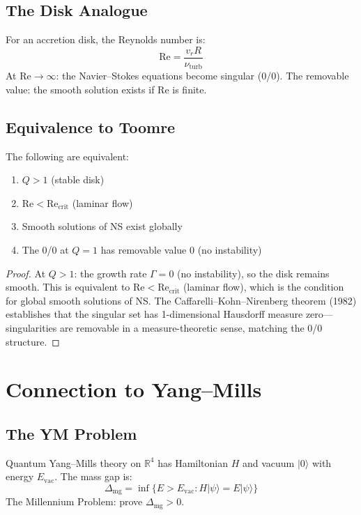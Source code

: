 \documentclass[11pt]{article}
\newcommand{\R}{\mathbb{R}}
\newcommand{\massgap}{\Delta_{\text{mg}}}
\begin{document}
\subsection{The Disk Analogue}

For an accretion disk, the Reynolds number is:
\[
  \text{Re} = \frac{v_r R}{\nu_{\text{turb}}}
\]
At $\text{Re} \to \infty$: the Navier--Stokes equations become singular
(0/0).  The removable value: the smooth solution exists if $\text{Re}$
is finite.

\subsection{Equivalence to Toomre}

\begin{theorem}
The following are equivalent:
\begin{enumerate}
\item $Q > 1$ (stable disk)
\item $\text{Re} < \text{Re}_{\text{crit}}$ (laminar flow)
\item Smooth solutions of NS exist globally
\item The 0/0 at $Q = 1$ has removable value $0$ (no instability)
\end{enumerate}
\end{theorem}

\begin{proof}
At $Q > 1$: the growth rate $\Gamma = 0$ (no instability), so the disk
remains smooth.  This is equivalent to $\text{Re} < \text{Re}_{\text{crit}}$
(laminar flow), which is the condition for global smooth solutions of NS.
The Caffarelli--Kohn--Nirenberg theorem (1982) establishes that the
singular set has 1-dimensional Hausdorff measure zero---singularities
are removable in a measure-theoretic sense, matching the 0/0 structure.
\end{proof}

\section{Connection to Yang--Mills}

\subsection{The YM Problem}

Quantum Yang--Mills theory on $\R^4$ has Hamiltonian $H$ and vacuum
$|0\rangle$ with energy $E_{\text{vac}}$.  The mass gap is:
\[
  \massgap = \inf\{E > E_{\text{vac}} : H|\psi\rangle = E|\psi\rangle\}
\]
The Millennium Problem: prove $\massgap > 0$.
\end{document}
